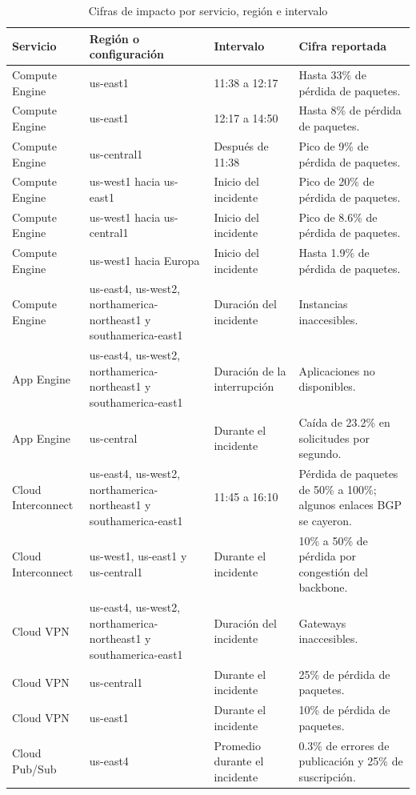 \documentclass[11pt]{article}
\begin{document}
\begin{table}[htbp]
\centering
\caption{Cifras de impacto por servicio, región e intervalo}
\label{tab:cifras}
\small
\begin{tabularx}{\textwidth}{p{3.2cm}p{3.4cm}p{3.2cm}X}
\hline
\textbf{Servicio} & \textbf{Región o configuración} & \textbf{Intervalo} & \textbf{Cifra reportada} \\
\hline
Compute Engine & us-east1 & 11:38 a 12:17 & Hasta 33\% de pérdida de paquetes. \\
Compute Engine & us-east1 & 12:17 a 14:50 & Hasta 8\% de pérdida de paquetes. \\
Compute Engine & us-central1 & Después de 11:38 & Pico de 9\% de pérdida de paquetes. \\
Compute Engine & us-west1 hacia us-east1 & Inicio del incidente & Pico de 20\% de pérdida de paquetes. \\
Compute Engine & us-west1 hacia us-central1 & Inicio del incidente & Pico de 8.6\% de pérdida de paquetes. \\
Compute Engine & us-west1 hacia Europa & Inicio del incidente & Hasta 1.9\% de pérdida de paquetes. \\
Compute Engine & us-east4, us-west2, northamerica-northeast1 y southamerica-east1 & Duración del incidente & Instancias inaccesibles. \\
App Engine & us-east4, us-west2, northamerica-northeast1 y southamerica-east1 & Duración de la interrupción & Aplicaciones no disponibles. \\
App Engine & us-central & Durante el incidente & Caída de 23.2\% en solicitudes por segundo. \\
Cloud Interconnect & us-east4, us-west2, northamerica-northeast1 y southamerica-east1 & 11:45 a 16:10 & Pérdida de paquetes de 50\% a 100\%; algunos enlaces BGP se cayeron. \\
Cloud Interconnect & us-west1, us-east1 y us-central1 & Durante el incidente & 10\% a 50\% de pérdida por congestión del backbone. \\
Cloud VPN & us-east4, us-west2, northamerica-northeast1 y southamerica-east1 & Duración del incidente & Gateways inaccesibles. \\
Cloud VPN & us-central1 & Durante el incidente & 25\% de pérdida de paquetes. \\
Cloud VPN & us-east1 & Durante el incidente & 10\% de pérdida de paquetes. \\
Cloud Pub/Sub & us-east4 & Promedio durante el incidente & 0.3\% de errores de publicación y 25\% de suscripción. \\

\end{tabularx}
\end{table}
\end{document}
